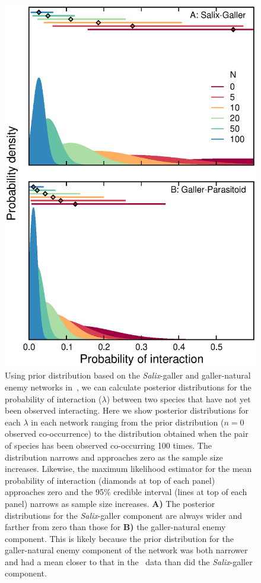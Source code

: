 \documentclass[12pt]{article}
\begin{document}

      \begin{figure}[ht]
        \caption{Using prior distribution based on the \emph{Salix}-galler and galler-natural enemy networks in~\citet{Barbour2016}, we can calculate posterior distributions for the probability of interaction ($\lambda$) between two species that have not yet been observed interacting. Here we show posterior distributions for each $\lambda$ in each network ranging from the prior distribution ($n=0$ observed co-occurrence) to the distribution obtained when the pair of species has been observed co-occurring 100 times. The distribution narrows and approaches zero as the sample size increases. Likewise, the maximum likelihood estimator for the mean probability of interaction (diamonds at top of each panel) approaches zero and the 95\% credible interval (lines at top of each panel) narrows as sample size increases. \textbf{A)} The posterior distributions for the \emph{Salix}-galler component are always wider and farther from zero than those for \textbf{B)} the galler-natural enemy component. This is likely because the prior distribution for the galler-natural enemy component of the network was both narrower and had a mean closer to that in the~\citet{Kopelke2017} data than did the \emph{Salix}-galler component.}
        \label{Salix_pdfs}
        \includegraphics*[width=.8\textwidth]{figures/Salix_Galler_pdfs_increasing_N.eps}
        \end{figure}
\end{document}
